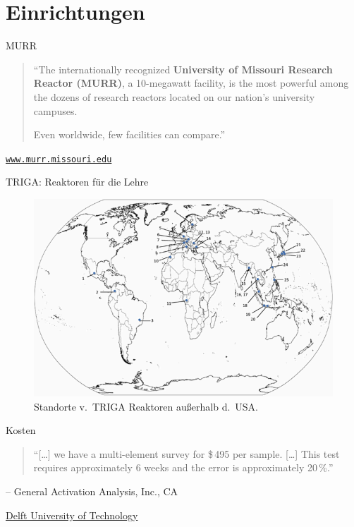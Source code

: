 \documentclass[xcolor=x11names, aspectratio=169]{beamer}
\begin{document}
\section{Einrichtungen}

\begin{frame}{MURR}
\begin{quote}
``The internationally recognized \textbf{University of Missouri Research Reactor (MURR)}, a 10-megawatt facility, is the \alert{most powerful} among the dozens of research reactors located on our nation’s university campuses. 

Even worldwide, few facilities can compare.''
\end{quote}
\vspace*{-2em}
\begin{flushright}
\href{www.murr.missouri.edu}{\texttt{www.murr.missouri.edu}}
\end{flushright}\bigskip
\end{frame}

\begin{frame}{TRIGA: Reaktoren für die Lehre}
\begin{figure}
\includegraphics[height=.75\textheight]{img/triga.png}
\caption{Standorte v.\ TRIGA Reaktoren außerhalb d.\ USA.}
\end{figure}
\end{frame}

\begin{frame}{Kosten}
\begin{quote}
``[\dots] we have a multi-element survey for \alert{\$\,495 per sample}. [\dots] This test requires approximately \alert{6 weeks} and the error is approximately 20\,\%.''
\end{quote}
\vspace*{-2em}
\begin{flushright}
-- General Activation Analysis, Inc., CA
\end{flushright}\bigskip

\href{http://www.tnw.tudelft.nl/en/cooperation/facilities/reactor-instituut-delft/services/inaa/pricelist/}{Delft University of Technology}
\end{frame}
\end{document}
